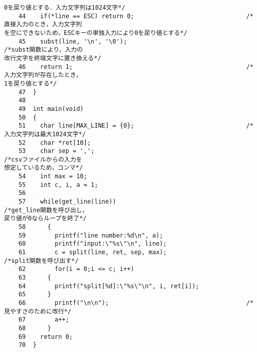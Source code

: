 \begin{Verbatim}[fontsize=\small, baselinestretch=0.8]
0を戻り値とする．入力文字列は1024文字*/
    44	  if(*line == ESC) return 0;                               /*直接入力のとき，入力文字列
を空にできないため，ESCキーの単独入力により0を戻り値とする*/
    45	  subst(line, '\n', '\0');                                 /*subst関数により，入力の
改行文字を終端文字に置き換える*/
    46	  return 1;                                                /*入力文字列が存在したとき，
1を戻り値とする*/
    47	}
    48	
    49	int main(void)
    50	{
    51	  char line[MAX_LINE] = {0};                               /*入力文字列は最大1024文字*/
    52	  char *ret[10];
    53	  char sep = ',';                                          /*csvファイルからの入力を
想定しているため，コンマ*/
    54	  int max = 10;
    55	  int c, i, a = 1;
    56	  
    57	  while(get_line(line))                                    /*get_line関数を呼び出し，
戻り値が0ならループを終了*/
    58	    {
    59	      printf("line number:%d\n", a);
    60	      printf("input:\"%s\"\n", line);
    61	      c = split(line, ret, sep, max);                      /*split関数を呼び出す*/
    62	      for(i = 0;i <= c; i++)
    63		{
    64		  printf("split[%d]:\"%s\"\n", i, ret[i]);
    65		}
    66	      printf("\n\n");                                      /*見やすさのために改行*/
    67	      a++;
    68	    }
    69	  return 0;
    70	}
\end{Verbatim}

